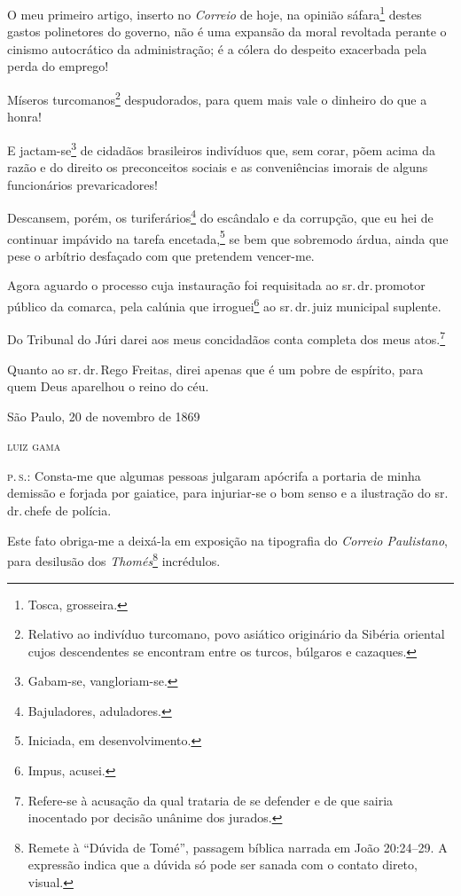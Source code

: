 O meu primeiro artigo, inserto no \emph{Correio} de hoje, na opinião
sáfara\footnote{Tosca, grosseira.} destes gastos polinetores do %
governo, não é uma expansão da moral revoltada perante o cinismo
autocrático da administração; é a cólera do despeito exacerbada pela
perda do emprego!

Míseros turcomanos\footnote{Relativo ao indivíduo turcomano, povo
  asiático originário da Sibéria oriental cujos descendentes se
  encontram entre os turcos, búlgaros e cazaques.} despudorados, para
quem mais vale o dinheiro do que a honra!

E jactam-se\footnote{Gabam-se, vangloriam-se.} de cidadãos brasileiros
indivíduos que, sem corar, põem acima da razão e do direito os
preconceitos sociais e as conveniências imorais de alguns funcionários
prevaricadores!

Descansem, porém, os turiferários\footnote{Bajuladores, aduladores.}
do escândalo e da corrupção, que eu hei de continuar impávido na tarefa
encetada,\footnote{Iniciada, em desenvolvimento.} se bem que sobremodo
árdua, ainda que pese o arbítrio desfaçado com que pretendem vencer-me.

Agora aguardo o processo cuja instauração foi requisitada ao sr.\,dr.\,promotor público da comarca, pela calúnia que irroguei\footnote{Impus,
  acusei.} ao sr.\,dr.\,juiz municipal suplente.

Do Tribunal do Júri darei aos meus concidadãos conta completa dos meus
atos.\footnote{Refere-se à acusação da qual trataria de se defender e
  de que sairia inocentado por decisão unânime dos jurados.}

Quanto ao sr.\,dr.\,Rego Freitas, direi apenas que é um pobre de espírito,
para quem Deus aparelhou o reino do céu.

\begin{flushright}
São Paulo, 20 de novembro de 1869

\textsc{luiz gama}
\end{flushright}

\textsc{p.\,s.:} Consta-me que algumas pessoas julgaram apócrifa a portaria de
minha demissão e forjada por gaiatice, para injuriar-se o bom senso e a
ilustração do sr.\,dr.\,chefe de polícia.

Este fato obriga-me a deixá-la em exposição na tipografia do
\emph{Correio Paulistano}, para desilusão dos \emph{Thomés}\footnote{
  Remete à ``Dúvida de Tomé'', passagem bíblica narrada em João
  20:24--29. A expressão indica que a dúvida só pode ser sanada com o
  contato direto, visual.} incrédulos.

